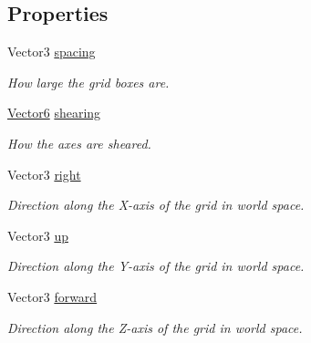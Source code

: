 \subsection*{Properties}
\begin{DoxyCompactItemize}
\item 
Vector3 \hyperlink{class_g_f_rect_grid_a149aa6bd8f08def54ce1b9dd843b6421_a149aa6bd8f08def54ce1b9dd843b6421}{spacing}
\begin{DoxyCompactList}\small\item\em How large the grid boxes are.\end{DoxyCompactList}\item 
\hyperlink{class_grid_framework_1_1_vectors_1_1_vector6}{Vector6} \hyperlink{class_g_f_rect_grid_af0534ff36d0058a2b00ea898c9ceadf6_af0534ff36d0058a2b00ea898c9ceadf6}{shearing}
\begin{DoxyCompactList}\small\item\em How the axes are sheared.\end{DoxyCompactList}\item 
Vector3 \hyperlink{class_g_f_rect_grid_acaaffd9ca33010bfb39b1b032b283d81_acaaffd9ca33010bfb39b1b032b283d81}{right}
\begin{DoxyCompactList}\small\item\em Direction along the X-\/axis of the grid in world space.\end{DoxyCompactList}\item 
Vector3 \hyperlink{class_g_f_rect_grid_a4e395afadccb994ea1faff1bdf9d7416_a4e395afadccb994ea1faff1bdf9d7416}{up}
\begin{DoxyCompactList}\small\item\em Direction along the Y-\/axis of the grid in world space.\end{DoxyCompactList}\item 
Vector3 \hyperlink{class_g_f_rect_grid_a64e371af00fca22f78362473730d4919_a64e371af00fca22f78362473730d4919}{forward}
\begin{DoxyCompactList}\small\item\em Direction along the Z-\/axis of the grid in world space.\end{DoxyCompactList}\end{DoxyCompactItemize}

